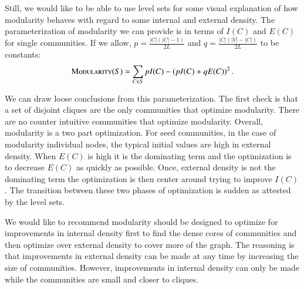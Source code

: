 \documentclass[phd,tocprelim]{cornell}
\begin{document}
Still, we would like to be able to use level sets for some visual explanation of how modularity behaves with regard to some internal and external density.  The parameterization of modularity we can provide is in terms of $I(C)$ and $E(C)$ for single communities.  If we allow, $p=\frac{|C|(|C|-1)}{2L}$ and $q=\frac{|C|(|V|-|C|)}{2L}$ to be constants:
\begin{equation}
 \mbox{\sc Modularity}(S) = \sum_{C \in S} p I(C) - \left(p I(C) + q E(C)\right)^2.
\end{equation}

We can draw loose conclusions from this parameterization.  The first check is that a set of disjoint cliques are the only communities that optimize modularity.  There are no counter intuitive communities that optimize modularity.  Overall, modularity is a two part optimization.  For seed communities, in the case of modularity individual nodes, the typical initial values are high in external density.  When $E(C)$ is high it is the dominating term and the optimization is to decrease $E(C)$ as quickly as possible.  Once, external density is not the dominating term the optimization is then center around trying to improve $I(C)$.  The transition between these two phases of optimization is sudden as attested by the level sets.

We would like to recommend modularity should be designed to optimize for improvements in internal density first to find the dense cores of communities and then optimize over external density to cover more of the graph.  The reasoning is that improvements in external density can be made at any time by increasing the size of communities.  However, improvements in internal density can only be made while the communities are small and closer to cliques.
\end{document}
